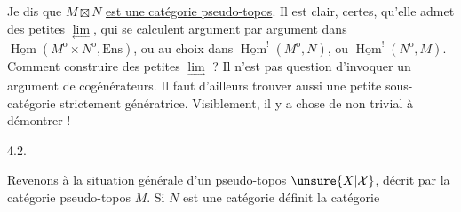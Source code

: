 


Je dis que $M\boxtimes N$ \uline{est une catégorie pseudo-topos}. Il est clair, certes, qu'elle admet des petites $\underset{\longleftarrow}{\lim}$, qui se calculent argument par argument dans $\underline{\operatorname{Hom}}(M^{\mathrm{o}}\times N^{\mathrm{o}},\mathrm{Ens})$, ou au choix dans $\underline{\operatorname{Hom}}^{!}(M^{\mathrm{o}},N)$, ou $\underline{\operatorname{Hom}}^{!}(N^{\mathrm{o}},M)$. Comment construire des petites $\underset{\longrightarrow}{\lim}$ ? Il n'est pas question d'invoquer un argument de cogénérateurs. Il faut d'ailleurs trouver aussi une petite sous-catégorie strictement génératrice. Visiblement, il y a  chose de non trivial à démontrer !

4.2. 

Revenons à la situation générale d'un pseudo-topos $\unsure{X|\mathcal X}$, décrit par la catégorie pseudo-topos $M$. Si $N$ est une catégorie  définit la catégorie

